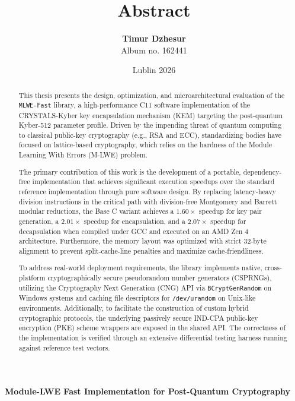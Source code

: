 \documentclass[12pt,a4paper]{article}
\title{\textbf{Abstract}}
\author{\textbf{Timur Dzhesur} \\ Album no. 162441}
\date{Lublin 2026}
\begin{document}
\maketitle

\thispagestyle{empty}

\vspace{1cm}

\begin{center}
    \textbf{Module-LWE Fast Implementation for Post-Quantum Cryptography}
\end{center}

\vspace{0.5cm}

\begin{abstract}
This thesis presents the design, optimization, and microarchitectural evaluation of the \texttt{MLWE-Fast} library, a high-performance C11 software implementation of the CRYSTALS-Kyber key encapsulation mechanism (KEM) targeting the post-quantum Kyber-512 parameter profile. Driven by the impending threat of quantum computing to classical public-key cryptography (e.g., RSA and ECC), standardizing bodies have focused on lattice-based cryptography, which relies on the hardness of the Module Learning With Errors (M-LWE) problem.

The primary contribution of this work is the development of a portable, dependency-free implementation that achieves significant execution speedups over the standard reference implementation through pure software design. By replacing latency-heavy division instructions in the critical path with division-free Montgomery and Barrett modular reductions, the Base C variant achieves a $1.60\times$ speedup for key pair generation, a $2.01\times$ speedup for encapsulation, and a $2.07\times$ speedup for decapsulation when compiled under GCC and executed on an AMD Zen 4 architecture. Furthermore, the memory layout was optimized with strict 32-byte alignment to prevent split-cache-line penalties and maximize cache-friendliness.

To address real-world deployment requirements, the library implements native, cross-platform cryptographically secure pseudorandom number generators (CSPRNGs), utilizing the Cryptography Next Generation (CNG) API via \texttt{BCryptGenRandom} on Windows systems and caching file descriptors for \texttt{/dev/urandom} on Unix-like environments. Additionally, to facilitate the construction of custom hybrid cryptographic protocols, the underlying passively secure IND-CPA public-key encryption (PKE) scheme wrappers are exposed in the shared API. The correctness of the implementation is verified through an extensive differential testing harness running against reference test vectors.
\end{abstract}
\end{document}
